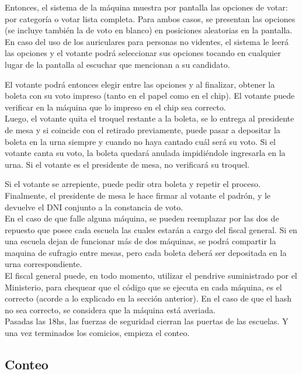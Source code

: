 Entonces, el sistema de la máquina muestra por pantalla las opciones de votar: por categoría o votar lista completa. Para ambos casos, se presentan las opciones (se incluye también la de voto en blanco) en posiciones aleatorias en la pantalla. En caso del uso de los auriculares para personas no videntes, el sistema le leer\'a las opciones y el votante podr\'a seleccionar sus opciones tocando en cualquier lugar de la pantalla al escuchar que mencionan a su candidato.

El votante podrá entonces elegir entre las opciones y al finalizar, obtener la boleta con su voto impreso (tanto en el papel como en el chip). El votante puede verificar en la máquina que lo impreso en el chip sea correcto.\\

Luego, el votante quita el troquel restante a la boleta, se lo entrega al presidente de mesa y si coincide con el retirado previamente, puede pasar a depositar la boleta en la urna siempre y cuando no haya cantado cuál será su voto. Si el votante canta su voto, la boleta quedará anulada impidiéndole ingresarla en la urna. Si el votante es el presidente de mesa, no verificar\'a su troquel.

Si el votante se arrepiente, puede pedir otra boleta y repetir el proceso.
Finalmente, el presidente de mesa le hace firmar al votante el padrón, y le devuelve el DNI conjunto a la constancia de voto.\\

En el caso de que falle alguna máquina, se pueden reemplazar por las dos de repuesto que posee cada escuela las cuales estarán a cargo del fiscal general. Si en una escuela dejan de funcionar más de dos máquinas, se podrá compartir la maquina de sufragio entre mesas, pero cada boleta deberá ser depositada en la urna correspondiente.\\

El fiscal general puede, en todo momento, utilizar el pendrive suministrado por el Ministerio, para chequear que el código que se ejecuta en cada máquina, es el correcto (acorde a lo explicado en la secci\'on anterior). En el caso de que el hash no sea correcto, se considera que la m\'aquina est\'a averiada.\\

Pasadas las 18hs, las fuerzas de seguridad cierran las puertas de las escuelas. Y una vez terminados los comicios, empieza el conteo.\\

\subsection{Conteo}


